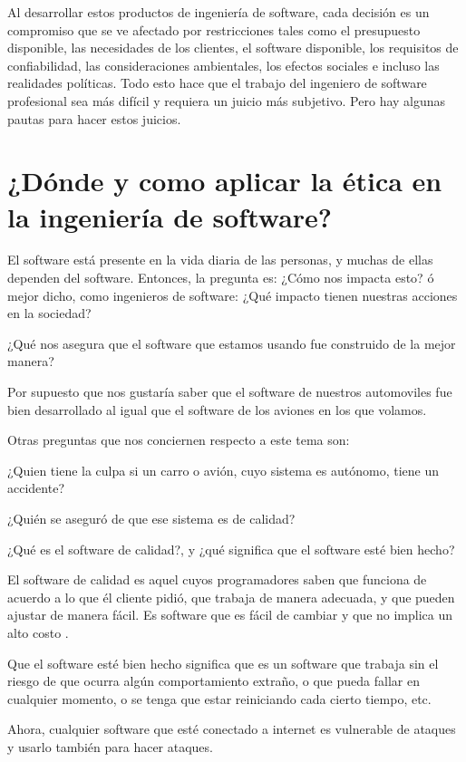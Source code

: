 \documentclass[twoside]{article}
\begin{document}
\begin{multicols}{2}
Al desarrollar estos productos de ingeniería de software, cada decisión es un
compromiso que se ve afectado por restricciones tales como el presupuesto
disponible, las necesidades de los clientes, el software disponible, los
requisitos de confiabilidad, las consideraciones ambientales, los efectos
sociales e incluso las realidades políticas. Todo esto hace que el trabajo del
ingeniero de software profesional sea más difícil y requiera un juicio más
subjetivo. Pero hay algunas pautas para hacer estos juicios.

\section{¿Dónde y como aplicar la ética en la ingeniería de software?}

El software está presente en la vida diaria de las personas, y muchas de ellas
dependen del software. Entonces, la pregunta es: ¿Cómo nos impacta esto? ó mejor
dicho, como ingenieros de software: ¿Qué impacto tienen nuestras acciones en la
sociedad?

¿Qué nos asegura que el software que estamos usando fue construido de la mejor
manera?

Por supuesto que nos gustaría saber que el software de nuestros automoviles fue
bien desarrollado al igual que el software de los aviones en los que volamos.

Otras preguntas que nos conciernen respecto a este tema son:

¿Quien tiene la culpa si un carro o avión, cuyo sistema es autónomo, tiene un
accidente?

¿Quién se aseguró de que ese sistema es de calidad?

¿Qué es el software de calidad?, y ¿qué significa que el software esté bien hecho?

El software de calidad es aquel cuyos programadores saben que funciona de
acuerdo a lo que él cliente pidió, que trabaja de manera adecuada, y que pueden
ajustar de manera fácil. Es software que es fácil de cambiar y que no implica un
alto costo \cite{CMartin2022EthicsManifesto}.

Que el software esté bien hecho significa que es un software que trabaja sin el
riesgo de que ocurra algún comportamiento extraño, o que pueda fallar en
cualquier momento, o se tenga que estar reiniciando cada cierto tiempo, etc.

Ahora, cualquier software que esté conectado a internet es vulnerable de ataques
y usarlo también para hacer ataques.


\end{multicols}
\end{document}

